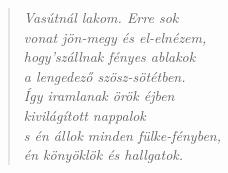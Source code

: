 \documentclass[a4paper,12pt,twoside,final]{book}
\begin{document}
\newpage


\settowidth{\versewidth}{}

\begin{verse}%
\end{verse}


\newpage

\settowidth{\versewidth}{}

\begin{verse}%
  \it
  Vasútnál lakom. Erre sok \\
  vonat jön-megy és el-elnézem, \\
  hogy'szállnak fényes ablakok \\
  a lengedező szösz-sötétben. \\
  Így iramlanak örök éjben \\
  kivilágított nappalok \\
  s én állok minden fülke-fényben, \\
  én könyöklök és hallgatok. \\
\end{verse}
\end{document}
